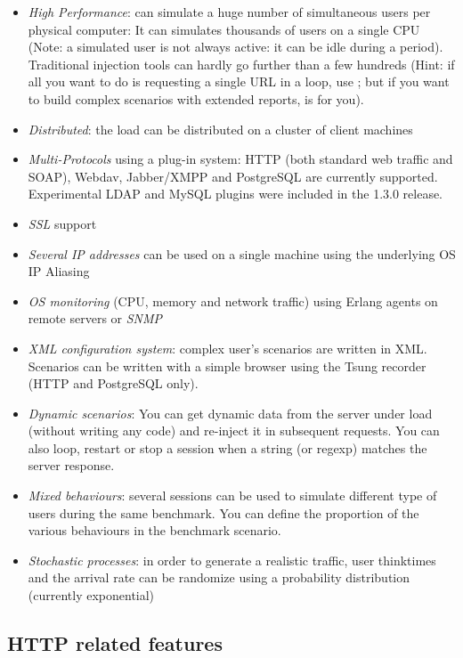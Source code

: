 \documentclass{IDXDOC-en}
\begin{document}
\begin{itemize}
\item \emph{High Performance}:  can simulate a
  huge number of simultaneous users per physical computer: It can
  simulates thousands of users on a single CPU (Note: a simulated user
  is not always active: it can be idle during a 
  period). Traditional injection tools can hardly go further than a
  few hundreds (Hint: if all you want to do is requesting a single URL
  in a loop, use ; but if you want to build complex
  scenarios with extended reports,  is for you).
\item \emph{Distributed}: the load can be distributed on a cluster of
client machines
\item \emph{Multi-Protocols} using a plug-in system: HTTP (both standard
web traffic and SOAP),  Webdav, Jabber/XMPP and PostgreSQL are currently
supported. Experimental LDAP and MySQL plugins were included in the 1.3.0 release.
\item \emph{SSL} support
\item \emph{Several IP addresses} can be used on a single machine using
the underlying OS IP Aliasing
\item \emph{OS monitoring} (CPU, memory and network traffic) using Erlang
agents on remote servers or \emph{SNMP}
\item \emph{XML configuration system}: complex user's scenarios are written
  in XML. Scenarios can be written with a simple browser using the
  Tsung recorder (HTTP and PostgreSQL only).
\item \emph{Dynamic scenarios}: You can get dynamic data from the
  server under load (without writing any code) and re-inject it in
  subsequent requests. You can also loop, restart or stop a
  session when a string (or regexp) matches the server response.
\item \emph{Mixed behaviours}: several sessions can be used to simulate
different type of users during the same benchmark. You can define
the proportion of the various behaviours in the benchmark scenario.
\item \emph{Stochastic processes}: in order to generate a realistic traffic,
user thinktimes and the arrival rate can be randomize using a probability
distribution (currently exponential)
\end{itemize}

\subsection{HTTP related features}
\end{document}
